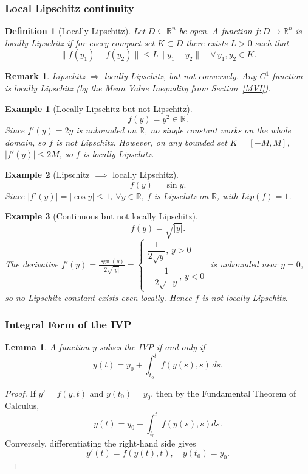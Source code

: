 \documentclass{article}
\newtheorem{lemma}[theorem]{Lemma}
\newtheorem{definition}{Definition}
\newtheorem*{example}{Example}
\newtheorem{remark}{Remark}
\newcommand{\R}{\mathbb{R}}
\newcommand{\sgn}{\operatorname{sgn}}
\begin{document}
\subsubsection{Local Lipschitz continuity}
\begin{definition}[Locally Lipschitz]
    Let $D \subseteq \R^n$ be open. A function $f : D \to \R^n$ is \emph{locally Lipschitz} if for every compact set $K \subset D$ there exists $L > 0$ such that
    \[\|f(y_1) - f(y_2)\| \leq L\|y_1 - y_2\| \quad \forall\, y_1, y_2 \in K.\]
\end{definition}
\begin{remark}
    Lipschitz $\Rightarrow$ locally Lipschitz, but not conversely.  
    Any $C^1$ function is locally Lipschitz (by the Mean Value 
    Inequality from Section~\ref{MVI}).
\end{remark}
\begin{example}[Locally Lipschitz but not Lipschitz]
    \[f(y) = y^2 \in \R.\]
    Since \(f'(y)=2y\) is unbounded on \(\R\), no single constant works on the whole domain, so \(f\) is not Lipschitz.  
    However, on any bounded set \(K=[-M,M]\), \(|f'(y)| \le 2M\), so \(f\) is locally Lipschitz.
\end{example}
\begin{example}[Lipschitz $\implies$ locally Lipschitz]
    \[f(y) = \sin y.\]
    Since \(|f'(y)| = |\cos y| \leq 1\), $\forall y \in \R$, $f$ is Lipschitz on \(\R\), with \(Lip(f) = 1\).
\end{example}
\begin{example}[Continuous but not locally Lipschitz]
    \[f(y) = \sqrt{|y|}.\]
    The derivative $f'(y) = \frac{\sgn(y)}{2\sqrt{|y|}} = \begin{cases} \dfrac{1}{2\sqrt{y}},\,y > 0 \\ -\dfrac{1}{2\sqrt{-y}},\, y < 0 \end{cases}$ is unbounded near \(y = 0\), so no Lipschitz constant exists even locally. Hence \(f\) is not locally Lipschitz.
\end{example}

\subsubsection{Integral Form of the IVP}
\begin{lemma}
    A function \(y\) solves the IVP if and only if
    \[y(t) = y_0 + \int_{t_0}^{t} f(y(s),s)\,ds.\]
\end{lemma}
\begin{proof}
    If \(y' = f(y,t)\) and \(y(t_0) = y_0\), then by the Fundamental Theorem of Calculus,
    \[y(t) = y_0 + \int_{t_0}^{t} f(y(s),s)ds.\]
    Conversely, differentiating the right-hand side gives
    \[y'(t) = f(y(t),t), \quad y(t_0) = y_0.\]
\end{proof}
\end{document}
